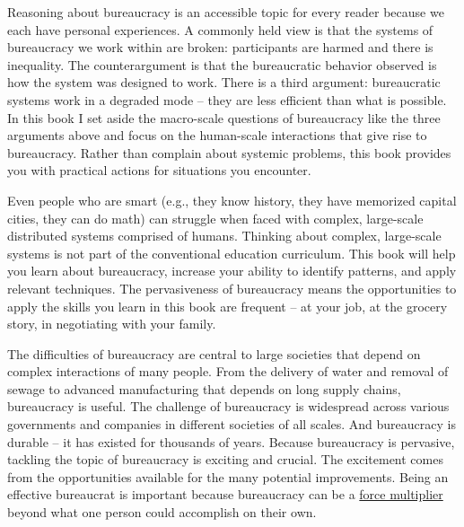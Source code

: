 Reasoning about bureaucracy is an accessible topic for every reader because we each have personal experiences.
A commonly held view is that the systems of bureaucracy we work within are broken: participants are harmed and there is inequality. 
The counterargument is that the bureaucratic behavior observed is how the system was designed to work. There is a third argument: bureaucratic systems work in a degraded mode -- they are less efficient than what is possible. 
In this book I set aside the macro-scale questions of bureaucracy like the three arguments above and focus on the human-scale interactions that give rise to bureaucracy. Rather than complain about systemic problems, this book provides you with practical actions for situations you encounter.

Even people who are smart (e.g., they know history, they have memorized capital cities, they can do math) can struggle when faced with complex, large-scale distributed systems comprised of humans. Thinking about complex, large-scale systems is not part of the conventional education curriculum. This book will help you learn about bureaucracy, increase your ability to identify patterns, and apply relevant techniques. The pervasiveness of bureaucracy means the opportunities to apply the skills you learn in this book are frequent -- at your job, at the grocery story, in negotiating with your family.


The difficulties of bureaucracy are central to large societies that depend on complex interactions of many people. From the delivery of water and removal of sewage to advanced manufacturing that depends on long supply chains, bureaucracy is useful.  The challenge of bureaucracy is widespread across various governments and companies in different societies of all scales. And bureaucracy is durable -- it has existed for thousands of years. Because bureaucracy is pervasive, tackling the topic of bureaucracy is exciting and crucial. The excitement comes from the opportunities available for the many potential improvements.
Being an effective bureaucrat is important because bureaucracy can be a \href{https://en.wikipedia.org/wiki/Force_multiplication}{force multiplier}\iftoggle{WPinmargin}{\marginpar{[Wikipedia] Force\\multiplication}}{}
beyond what one person could accomplish on their own.

